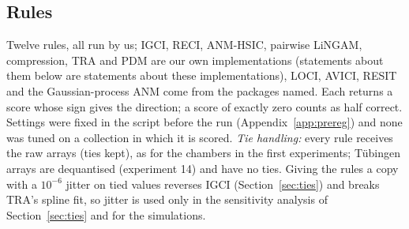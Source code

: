 \subsection{Rules}\label{sec:rules}
Twelve rules, all run by us; IGCI, RECI, ANM-HSIC, pairwise LiNGAM, compression, TRA and PDM are our own implementations (statements about them below are statements about these implementations), LOCI, AVICI, RESIT and the Gaussian-process ANM come from the packages named. Each returns a score whose sign gives the direction; a score of exactly zero counts as half correct. Settings were fixed in the script before the run (Appendix~\ref{app:prereg}) and none was tuned on a collection in which it is scored. \emph{Tie handling:} every rule receives the raw arrays (ties kept), as for the chambers in the first experiments; T\"ubingen arrays are dequantised (experiment 14) and have no ties. Giving the rules a copy with a $10^{-6}$ jitter on tied values reverses IGCI (Section~\ref{sec:ties}) and breaks TRA's spline fit, so jitter is used only in the sensitivity analysis of Section~\ref{sec:ties} and for the simulations.
